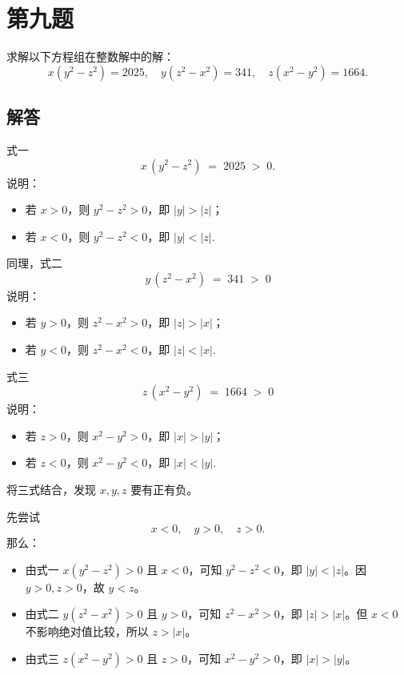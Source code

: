 \documentclass[12pt, a4paper]{article}
\theoremstyle{definition}
\theoremstyle{remark}
\begin{document}
\newpage

\section{第九题}

\noindent 求解以下方程组在整数解中的解：
$$
x\left(y^2-z^2\right)=2025, \quad y\left(z^2-x^2\right)=341, \quad z\left(x^2-y^2\right)=1664.
$$


\subsection{解答}

\noindent 式一
$$
x\,(y^2 - z^2) \;=\; 2025 \;>\; 0.
$$
说明：
\begin{itemize}
    \item 若 \(x > 0\)，则 \(y^2 - z^2 > 0\)，即 \(\lvert y\rvert > \lvert z\rvert\)；
    \item 若 \(x < 0\)，则 \(y^2 - z^2 < 0\)，即 \(\lvert y\rvert < \lvert z\rvert\).
\end{itemize}

\noindent 同理，式二
$$
y\,(z^2 - x^2) \;=\; 341 \;>\; 0
$$
说明：
\begin{itemize}
    \item 若 \(y > 0\)，则 \(z^2 - x^2 > 0\)，即 \(\lvert z\rvert > \lvert x\rvert\)；
    \item 若 \(y < 0\)，则 \(z^2 - x^2 < 0\)，即 \(\lvert z\rvert < \lvert x\rvert\).
\end{itemize}

\noindent 式三
$$
z\,(x^2 - y^2) \;=\; 1664 \;>\; 0
$$
说明：
\begin{itemize}
    \item 若 \(z > 0\)，则 \(x^2 - y^2 > 0\)，即 \(\lvert x\rvert > \lvert y\rvert\)；
    \item 若 \(z < 0\)，则 \(x^2 - y^2 < 0\)，即 \(\lvert x\rvert < \lvert y\rvert\).
\end{itemize}

\noindent 将三式结合，发现 \(x, y, z\) 要有正有负。

\noindent 先尝试
$$
x < 0, \quad y > 0, \quad z > 0.
$$
那么：
\begin{itemize}
    \item 由式一 \(x(y^2 - z^2) > 0\) 且 \(x < 0\)，可知 \(y^2 - z^2 < 0\)，即 \(\lvert y\rvert < \lvert z\rvert\)。因 \(y > 0, z > 0\)，故 \(y < z\)。
    \item 由式二 \(y(z^2 - x^2) > 0\) 且 \(y > 0\)，可知 \(z^2 - x^2 > 0\)，即 \(\lvert z\rvert > \lvert x\rvert\)。但 \(x < 0\) 不影响绝对值比较，所以 \(z > \lvert x\rvert\)。
    \item 由式三 \(z(x^2 - y^2) > 0\) 且 \(z > 0\)，可知 \(x^2 - y^2 > 0\)，即 \(\lvert x\rvert > \lvert y\rvert\)。  
\end{itemize}
\end{document}
